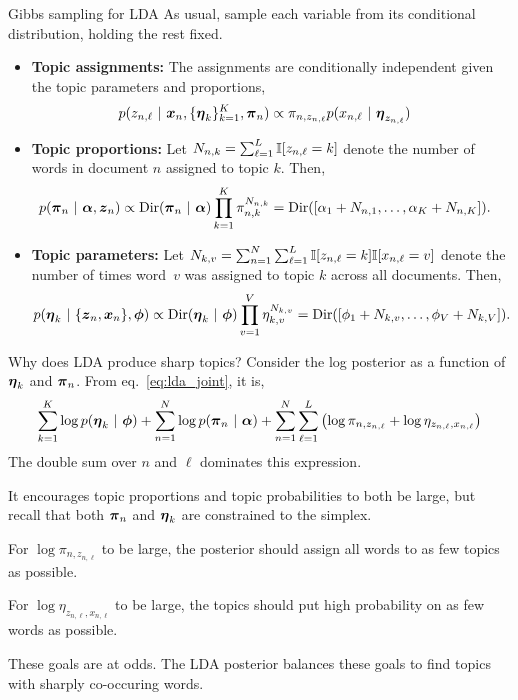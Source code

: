 \documentclass[aspectratio=169]{beamer}
\begin{document}
\begin{frame}{Gibbs sampling for LDA}
As usual, sample each variable from its conditional distribution, holding the rest fixed.

\begin{itemize}
    \item<1-> \textbf{Topic assignments:} The assignments are conditionally independent given the topic parameters and proportions,
    \begin{align}
        p(z_{n,\ell} ~\vert~ \boldsymbol{x}_n, \{\boldsymbol{\eta}_k\}_{k=1}^K, \boldsymbol{\pi}_n) &\propto \pi_{n, z_{n, \ell}} p(x_{n, \ell} ~\vert~ \boldsymbol{\eta}_{z_{n, \ell}})
    \end{align}
    
    \item<2-> \textbf{Topic proportions: } Let $N_{n,k} = \sum_{\ell=1}^L \mathbb{I}[z_{n,\ell} = k]$ denote the number of words in document $n$ assigned to topic $k$. Then,
    \begin{align}
        p(\boldsymbol{\pi}_n ~\vert~ \boldsymbol{\alpha}, \boldsymbol{z}_n) &\propto \mathrm{Dir}(\boldsymbol{\pi}_n ~\vert~ \boldsymbol{\alpha}) \prod_{k=1}^K \pi_{n,k}^{N_{n,k}} = \mathrm{Dir}([\alpha_1 + N_{n,1}, \ldots, \alpha_K + N_{n,K}]).
    \end{align}
    
    \item<3-> \textbf{Topic parameters: } Let $N_{k,v} = \sum_{n=1}^N \sum_{\ell=1}^L \mathbb{I}[z_{n,\ell}=k] \mathbb{I}[x_{n,\ell}=v]$ denote the number of times word~$v$ was assigned to topic $k$ across all documents. Then,
\begin{align}
    p(\boldsymbol{\eta}_k ~\vert~ \{\boldsymbol{z}_n, \boldsymbol{x}_n\}, \boldsymbol{\phi}) &\propto
    \mathrm{Dir}(\boldsymbol{\eta}_k ~\vert~ \boldsymbol{\phi}) \prod_{v=1}^V \eta_{k,v}^{N_{k,v}} = \mathrm{Dir}([\phi_1 + N_{k,v}, \ldots, \phi_V + N_{k,V}]).
\end{align}

\end{itemize}
\end{frame}

\begin{frame}{Why does LDA produce sharp topics?}
Consider the log posterior as a function of $\boldsymbol{\eta}_k$ and $\boldsymbol{\pi}_n$. From eq.~\ref{eq:lda_joint}, it is,
\begin{align}
    \sum_{k=1}^K \log p(\boldsymbol{\eta}_k ~\vert~ \boldsymbol{\phi}) + \sum_{n=1}^N \log p(\boldsymbol{\pi}_n ~\vert~ \boldsymbol{\alpha}) + \sum_{n=1}^N \sum_{\ell=1}^L \left( \log \pi_{n, z_{n, \ell}} + \log \eta_{z_{n, \ell}, x_{n, \ell}} \right)
\end{align}
The double sum over $n$ and $\ell$ dominates this expression.

It encourages topic proportions and topic probabilities to both be large, but recall that both $\boldsymbol{\pi}_n$ and $\boldsymbol{\eta}_k$ are constrained to the simplex.

For $\log \pi_{n,z_{n,\ell}}$ to be large, the posterior should assign all words to as few topics as possible. 

For $\log \eta_{z_{n,\ell}, x_{n, \ell}}$ to be large, the topics should put high probability on as few words as possible.

These goals are at odds. The LDA posterior balances these goals to find topics with sharply co-occuring words.

\end{frame}
\end{document}
